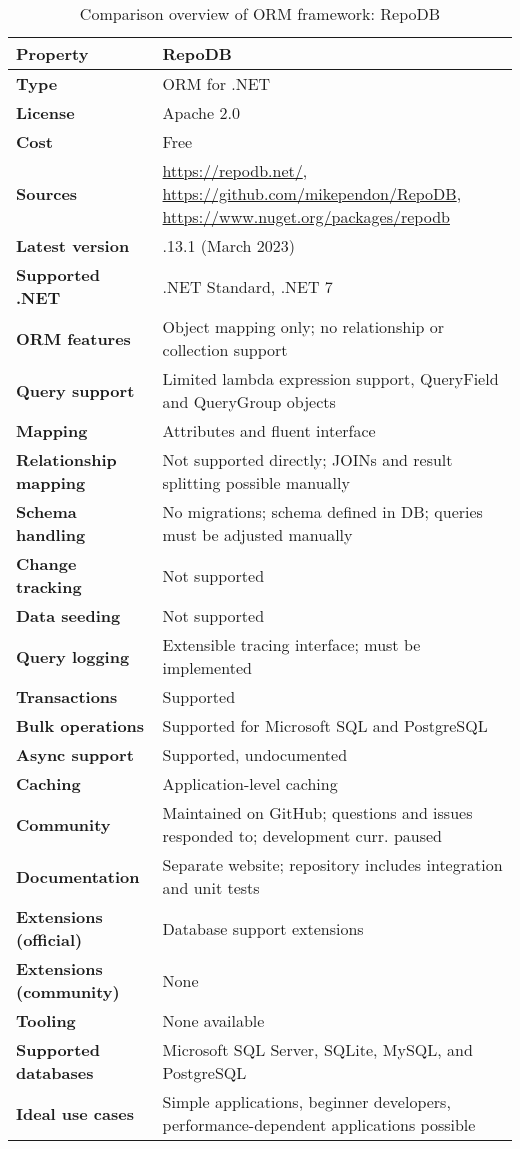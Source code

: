 \begin{table}[H]
\centering
\caption{Comparison overview of ORM framework: RepoDB}
\begin{tabular}{|l|l|}
\toprule
\textbf{Property} & \textbf{RepoDB} \\
\midrule
\textbf{Type} & ORM for .NET \\
\textbf{License} & Apache 2.0 \\
\textbf{Cost} & Free \\
\textbf{Sources} & \url{https://repodb.net/}, \url{https://github.com/mikependon/RepoDB}, \url{https://www.nuget.org/packages/repodb}  \\
\textbf{Latest version} & .13.1  (March 2023) \\
\textbf{Supported .NET} & .NET Standard, .NET 7 \\
\textbf{ORM features} & Object mapping only; no relationship or collection support \\
\textbf{Query support} & Limited lambda expression support, QueryField and QueryGroup objects \\
\textbf{Mapping} & Attributes and fluent interface \\
\textbf{Relationship mapping} & Not supported directly; JOINs and result splitting possible manually \\
\textbf{Schema handling} & No migrations; schema defined in DB; queries must be adjusted manually \\
\textbf{Change tracking} & Not supported \\
\textbf{Data seeding} & Not supported \\
\textbf{Query logging} & Extensible tracing interface; must be implemented \\
\textbf{Transactions} & Supported \\
\textbf{Bulk operations} & Supported for Microsoft SQL and PostgreSQL \\
\textbf{Async support} & Supported, undocumented \\
\textbf{Caching} & Application-level caching \\
\textbf{Community} & Maintained on GitHub; questions and issues responded to; development curr. paused \\
\textbf{Documentation} & Separate website; repository includes integration and unit tests\\
\textbf{Extensions (official)} & Database support extensions \\
\textbf{Extensions (community)} & None \\
\textbf{Tooling} & None available \\
\textbf{Supported databases} & Microsoft SQL Server, SQLite, MySQL, and PostgreSQL \\
\textbf{Ideal use cases} & Simple applications, beginner developers, performance-dependent applications possible \\
\bottomrule
\end{tabular}
\end{table}


